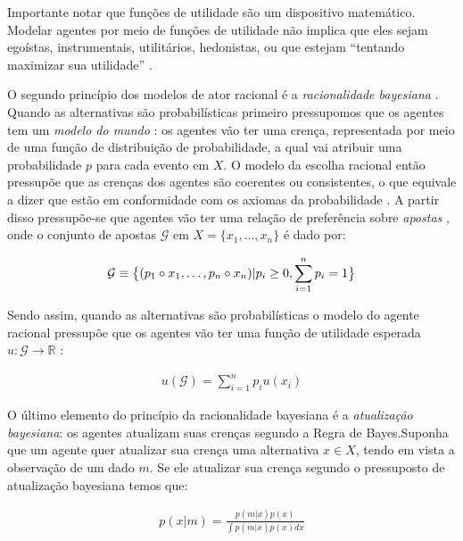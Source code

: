 Importante notar que funções de utilidade são um dispositivo matemático. Modelar
agentes por meio de funções de utilidade não implica que eles sejam egoístas,
instrumentais, utilitários, hedonistas, ou que estejam ``tentando maximizar sua
utilidade'' \cite{gaus2007philosophy}.

O segundo princípio dos modelos de ator racional é a \textit{racionalidade
  bayesiana} \cite{gintis2016individuality}. Quando as alternativas são
probabilísticas primeiro pressupomos que os agentes tem um \textit{modelo do
  mundo} \cite{acemoglu2011opinion}: os agentes vão ter uma crença, representada
por meio de uma função de distribuição de probabilidade, a qual vai atribuir uma
probabilidade \(p\) para cada evento em \(X\). O modelo da escolha racional
então pressupõe que as crenças dos agentes são coerentes ou consistentes, o que
equivale a dizer que estão em conformidade com os axiomas da probabilidade
\cite{jackman2009bayesian}. A partir disso pressupõe-se que agentes vão ter uma
relação de preferência sobre \textit{apostas} \cite{jehle2001advanced}, onde o
conjunto de apostas \(\mathcal{G}\) em \(X = \{ x_1, \ldots, x_n \}\) é dado
por:

\begin{align*}
  \mathcal{G} \equiv \big{\{}  (p_1 \circ x_1, \ldots, p_n \circ x_n  ) | p_i \geq 0, \sum_{i = 1 }^n p_i = 1  \big{\}}  
\end{align*}

Sendo assim, quando as alternativas são probabilísticas o modelo do agente
racional pressupõe que os agentes vão ter uma função de utilidade esperada \(u:
\mathcal{G} \to \mathbb{R} \)
\cite{jehle2001advanced,sep-rationality-normative-utility}:

\begin{align*}
  u(\mathcal{G}) = \sum_{i =1}^n p_i u(x_i)
\end{align*}

O último elemento do princípio da racionalidade bayesiana é a
\textit{atualização bayesiana}\cite[p.104]{gintis2016individuality}: os agentes
atualizam suas crenças segundo a Regra de Bayes.Suponha que um agente quer
atualizar sua crença uma alternativa \(x \in X\), tendo em vista a observação de
um dado \(m\). Se ele atualizar sua crença segundo o pressuposto de atualização
bayesiana temos que:

\begin{align*}
  p(x|m) =
  \frac{p(m|x)
  p(x)}
  {\int p(m|x)
  p(x)
  dx}
\end{align*}

